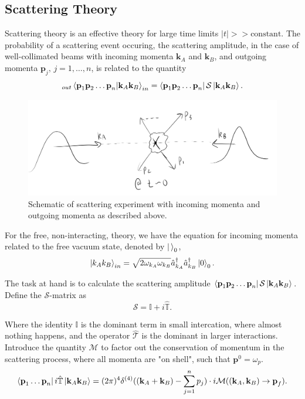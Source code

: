 \subsection*{Scattering Theory}

\noindent Scattering theory is an effective theory for large time limits $|t| >> \text{constant}$. The probability of a scattering event occuring, the scattering amplitude, in the case of well-collimated beams with incoming momenta $\textbf{k}_A$ and $\textbf{k}_B$, and outgoing momenta $\textbf{p}_j, \, j=1,\dots,n$, is related to the quantity
\begin{equation}
_{out}\braket{\textbf{p}_1 \textbf{p}_2 \dots \textbf{p}_n | \textbf{k}_A \textbf{k}_B}_{in} = \bra{\textbf{p}_1 \textbf{p}_2 \dots \textbf{p}_n} \mathcal{S} \ket{\textbf{k}_A \textbf{k}_B} .
\end{equation}

\begin{figure}[H]
	\centering
	\includegraphics[scale=0.4]{images/scattering.png}
	\caption{Schematic of scattering experiment with incoming momenta and outgoing momenta as described above.}
\end{figure}

\noindent For the free, non-interacting, theory, we have the equation for incoming momenta related to the free vacuum state, denoted by $\ket{\,}_0$,
\begin{equation}
\ket{k_A k_B}_{in} = \sqrt{2 \omega_{k_A} \omega_{k_B}} \hat{a}_{k_A}^\dagger \hat{a}_{k_B}^\dagger \ket{0}_0 .
\end{equation}

\noindent The task at hand is to calculate the scattering amplitude $\bra{\textbf{p}_1 \textbf{p}_2 \dots \textbf{p}_n} \mathcal{S} \ket{\textbf{k}_A \textbf{k}_B}$. Define the $\mathcal{S}$-matrix as
\begin{equation}
\mathcal{S} = \mathbb{I} + i \hat{\mathbb{T}}.
\end{equation}

\noindent Where the identity $\mathbb{I}$ is the dominant term in small intercation, where almost nothing happens, and the operator $\hat{\mathcal{T}}$ is the dominant in larger interactions. Introduce the quantity $\mathcal{M}$ to factor out the conservation of momentum in the scattering process, where all momenta are "on shell", such that $\textbf{p}^0 = \omega_p$. 
\begin{equation}
\bra{\textbf{p}_1 \dots \textbf{p}_n} i\hat{\mathbb{T}} \ket{\textbf{k}_A \textbf{k}_B} = (2\pi)^4 \delta^{(4)}((\textbf{k}_A + \textbf{k}_B) - \sum_{j=1}^{n} p_j) \cdot i \mathcal{M}((\textbf{k}_A, \textbf{k}_B) \to \textbf{p}_f).
\end{equation}

